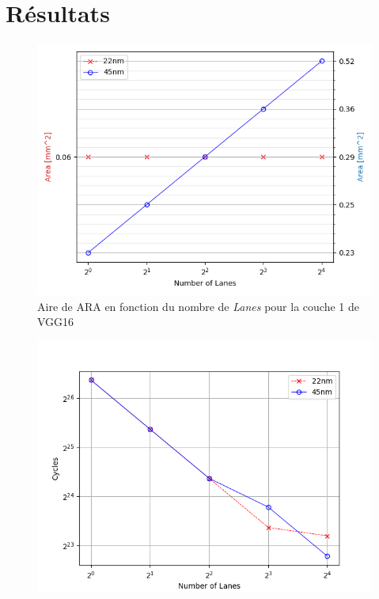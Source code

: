 \documentclass[11pt,letterpaper]{article}
\begin{document}
\section*{Résultats}
    \begin{multicols}{2}
        
    \begin{figure}[H]
        \centering
        \includegraphics[width=\linewidth]{area.png}
        \caption{Aire de ARA en fonction du nombre de \textit{Lanes} pour la couche 1 de VGG16}
        \label{fig:area}
    \end{figure}
    \begin{figure}[H]
        \centering
        \includegraphics[width=\linewidth]{cycles.png}

\end{figure}
\end{multicols}
\end{document}
